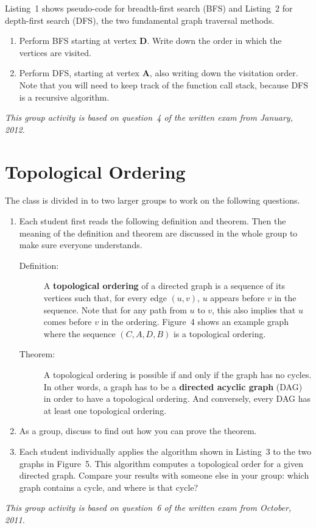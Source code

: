 \documentclass[a4paper]{article}
\begin{document}
Listing~1 shows pseudo-code for breadth-first search (BFS) and Listing~2 for depth-first search (DFS), the two fundamental graph traversal methods.

\begin{enumerate}
\item
  Perform BFS starting at vertex \textbf{D}.
  Write down the order in which the vertices are visited.
\item
  Perform DFS, starting at vertex \textbf{A}, also writing down the visitation order.
  Note that you will need to keep track of the function call stack, because DFS is a recursive algorithm.
\end{enumerate}

\noindent
\emph{This group activity is based on question~4 of the written exam from January, 2012.}


\pagebreak
\section{Topological Ordering}

The class is divided in to two larger groups to work on the following questions.

\begin{enumerate}
\item
  Each student first reads the following definition and theorem.
  Then the meaning of the definition and theorem are discussed in the whole group to make sure everyone understands.
  \begin{description}
  \item[Definition:]
    A \textbf{topological ordering} of a directed graph is a sequence of its vertices such that, for every edge $(u,v)$, $u$ appears before $v$ in the sequence.
    Note that for any path from $u$ to $v$, this also implies that $u$ comes before $v$ in the ordering.
    Figure~4 shows an example graph where the sequence $(C,A,D,B)$ is a topological ordering.
  \item[Theorem:]
    A topological ordering is possible if and only if the graph has no cycles.
    In other words, a graph has to be a \textbf{directed acyclic graph} (DAG) in order to have a topological ordering.
    And conversely, every DAG has at least one topological ordering.
  \end{description}
\item
  As a group, discuss to find out how you can prove the theorem.
\item
  Each student individually applies the algorithm shown in Listing~3 to the two graphs in Figure~5.
  This algorithm computes a topological order for a given directed graph.
  Compare your results with someone else in your group: which graph contains a cycle, and where is that cycle?
\end{enumerate}

\noindent
\emph{This group activity is based on question~6 of the written exam from October, 2011.}
\end{document}
